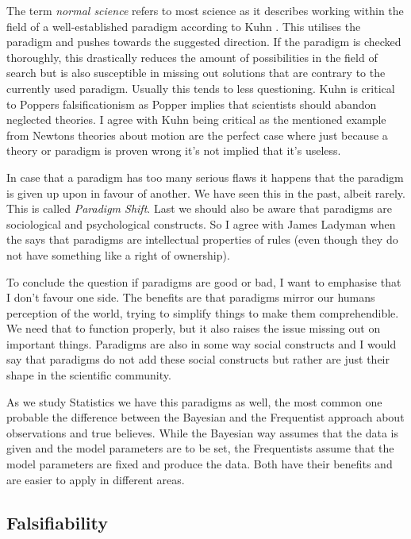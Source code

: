 \documentclass[11pt]{scrartcl}
\begin{document}
The term \textit{normal science} refers to most science as it describes working within the field of a well-established paradigm according to Kuhn \cite[p. 100]{ladyman}. This utilises the paradigm and pushes towards the suggested direction. If the paradigm is checked thoroughly, this drastically reduces the amount of possibilities in the field of search but is also susceptible in missing out solutions that are contrary to the currently used paradigm. Usually this tends to less questioning. Kuhn is critical to Poppers falsificationism \cite[p. 101]{ladyman} as Popper implies that scientists should abandon neglected theories. I agree with Kuhn being critical as the mentioned example from Newtons theories about motion are the perfect case where just because a theory or paradigm is proven wrong it's not implied that it's useless.

In case that a paradigm has too many serious flaws it happens that the paradigm is given up upon in favour of another. We have seen this in the past, albeit rarely. This is called \textit{Paradigm Shift}. Last we should also be aware that paradigms are sociological and psychological constructs. So I agree with James Ladyman when the says that paradigms are intellectual properties of rules (even though they do not have something like a right of ownership).

To conclude the question if paradigms are good or bad, I want to emphasise that I don't favour one side. The benefits are that paradigms mirror our humans perception of the world, trying to simplify things to make them comprehendible. We need that to function properly, but it also raises the issue missing out on important things. Paradigms are also in some way social constructs and I would say that paradigms do not add these social constructs but rather are just their shape in the scientific community.

As we study Statistics we have this paradigms as well, the most common one probable the difference between the Bayesian and the Frequentist approach about observations and true believes. While the Bayesian way assumes that the data is given and the model parameters are to be set, the Frequentists assume that the model parameters are fixed and produce the data. Both have their benefits and are easier to apply in different areas.


\subsection{Falsifiability}
\end{document}
